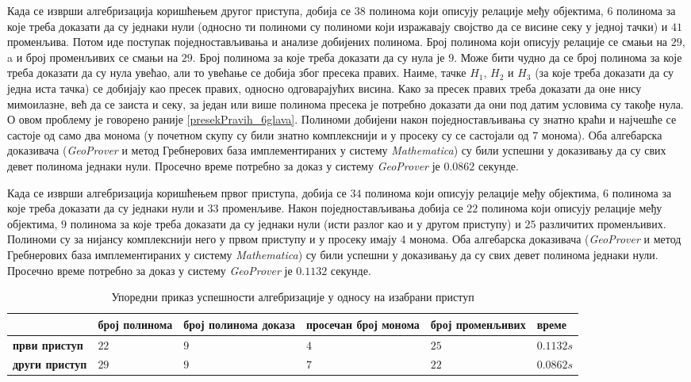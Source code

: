 Када се изврши алгебризација коришћењем другог приступа, добија се
$38$ полинома који описују релације међу објектима, $6$ полинома за
које треба доказати да су једнаки нули (односно ти полиноми су
полиноми који изражавају својство да се висине секу у једној тачки) и
$41$ променљива. Потом иде поступак поједностављивања и анализе
добијених полинома. Број полинома који описују релације се смањи на
$29$, a и број променљивих се смањи на $29$. Број полинома за које
треба доказати да су нула је $9$. Може бити чудно да се број полинома
за које треба доказати да су нула увећао, али то увећање се добија
због пресека правих. Наиме, тачке $H_1$, $H_2$ и $H_3$ (за које треба
доказати да су једна иста тачка) се добијају као пресек правих,
односно одговарајућих висина. Како за пресек правих треба доказати да
оне нису мимоилазне, већ да се заиста и секу, за један или више
полинома пресека је потребно доказати да они под датим условима су
такође нула. О овом проблему је говорено раније
\ref{presekPravih_6glava}. Полиноми добијени након поједностављивања
су знатно краћи и најчешће се састоје од само два монома (у почетном
скупу су били знатно комплекснији и у просеку су се састојали од $7$
монома). Оба алгебарска доказивача (\emph{GeoProver} и метод
Гребнерових база имплементираних у систему \emph{Mathematica}) су били
успешни у доказивању да су свих девет полинома једнаки нули. Просечно
време потребно за доказ у систему \emph{GeoProver} је $0.0862$
секунде.

Када се изврши алгебризација коришћењем првог приступа, добија се
$34$ полинома који описују релације међу објектима, $6$ полинома за
које треба доказати да су једнаки нули и $33$ променљиве. Након
поједностављивања добија се $22$ полинома који описују релације међу
објектима, $9$ полинома за које треба доказати да су једнаки нули
(исти разлог као и у другом приступу) и $25$ различитих
променљивих. Полиноми су за нијансу комплекснији него у првом приступу
и у просеку имају $4$ монома. Оба алгебарска доказивача
(\emph{GeoProver} и метод Гребнерових база имплементираних у систему
\emph{Mathematica}) су били успешни у доказивању да су свих девет
полинома једнаки нули. Просечно време потребно за доказ у систему
\emph{GeoProver} је $0.1132$ секунде. \\

\begin{table}[ht]
\begin{center}
\begin{tabular}{L{2cm}||R{2cm}|R{2cm}|R{2cm}|R{2cm}|R{1.5cm}}
\                   &  број полинома & број полинома доказа & просечан број монома & број променљивих & време \\
\hline
\hline
\textbf{први приступ} & $22$ & $9$ & $4$ & $25$ & $0.1132s$ \\
\hline
\textbf{други приступ} & $29$ & $9$ & $7$ & $22$ & $0.0862s$
\end{tabular}
\caption{Упоредни приказ успешности алгебризације у односу на изабрани приступ}
\end{center}
\end{table}

